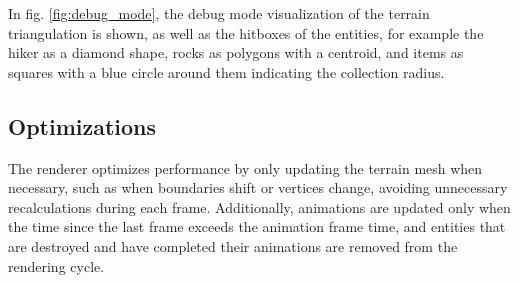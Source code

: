       In fig. \ref{fig:debug_mode}, the debug mode visualization of the terrain triangulation is shown, as well as the hitboxes of the entities, 
      for example the hiker as a diamond shape, rocks as polygons with a centroid, and items as squares with a blue circle around them indicating the collection radius.
    
    \subsection{Optimizations}
      The renderer optimizes performance by only updating the terrain mesh when necessary, such as when boundaries shift or vertices change, avoiding unnecessary recalculations during each frame. 
      Additionally, animations are updated only when the time since the last frame exceeds the animation frame time, and entities that are destroyed and have completed their animations are removed from the rendering cycle. 
      
